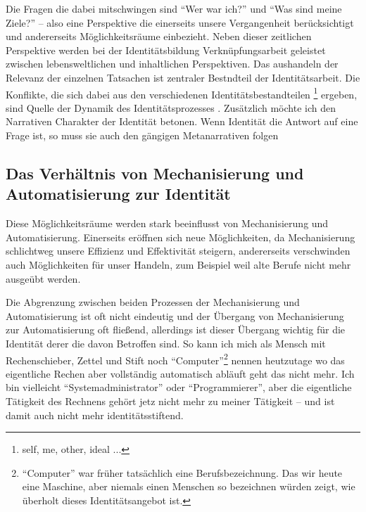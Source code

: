 Die Fragen die dabei mitschwingen sind \enquote{Wer war ich?} und \enquote{Was sind meine Ziele?} – also eine Perspektive die einerseits unsere Vergangenheit berücksichtigt und andererseits Möglichkeitsräume einbezieht.
Neben dieser zeitlichen Perspektive werden bei der Identitätsbildung Verknüpfungsarbeit geleistet zwischen lebensweltlichen und inhaltlichen Perspektiven.
Das aushandeln der Relevanz der einzelnen Tatsachen ist zentraler Bestndteil der Identitätsarbeit.
Die Konflikte, die sich dabei aus den verschiedenen Identitätsbestandteilen \footnote{self, me, other, ideal ...} ergeben, sind Quelle der Dynamik des Identitätsprozesses \parencite{keupp}.
Zusätzlich möchte ich den Narrativen Charakter der Identität betonen.
Wenn Identität die Antwort auf eine Frage ist, so muss sie auch den gängigen Metanarrativen folgen

\subsection {Das Verhältnis von Mechanisierung und Automatisierung zur Identität}

Diese Möglichkeitsräume werden stark beeinflusst von Mechanisierung und Automatisierung.
Einerseits eröffnen sich neue Möglichkeiten, da Mechanisierung schlichtweg unsere Effizienz und Effektivität steigern, andererseits verschwinden auch Möglichkeiten für unser Handeln, zum Beispiel weil alte Berufe nicht mehr ausgeübt werden.

Die Abgrenzung zwischen beiden Prozessen der Mechanisierung und Automatisierung ist oft nicht eindeutig und der Übergang von Mechanisierung zur Automatisierung oft fließend, allerdings ist dieser Übergang wichtig für die Identität derer die davon Betroffen sind.
So kann ich mich als Mensch mit Rechenschieber, Zettel und Stift noch \enquote{Computer}\footnote{\enquote{Computer} war früher tatsächlich eine Berufsbezeichnung. Das wir heute  eine Maschine, aber niemals einen Menschen so bezeichnen würden zeigt, wie überholt dieses Identitätsangebot ist.} nennen heutzutage wo das eigentliche Rechen aber vollständig automatisch abläuft geht das nicht mehr.
Ich bin vielleicht \enquote{Systemadministrator} oder \enquote{Programmierer}, aber die eigentliche Tätigkeit des Rechnens gehört jetz nicht mehr zu meiner Tätigkeit – und ist damit auch nicht mehr identitätsstiftend.

